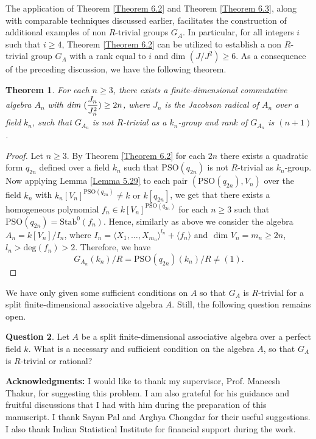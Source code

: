 \documentclass[12pt]{amsart}
\newtheorem{theorem}{Theorem}[section]
\theoremstyle{definition}
\newtheorem{question}[theorem]{Question}
\numberwithin{equation}{section}
\begin{document}
The application of Theorem \ref{Theorem 6.2} and Theorem \ref{Theorem 6.3}, along with comparable techniques discussed earlier, facilitates the construction of additional examples of non $R$-trivial groups \( G_A \). In particular, for all integers \( i \) such that \( i\geq 4 \), Theorem \ref{Theorem 6.2} can be utilized to establish a non $R$-trivial group \( G_A \) with a rank equal to \( i \) and $\text{dim }(J/J^2)\geq 6$. As a consequence of the preceding discussion, we have the following theorem.
\begin{theorem}\label{Theorem 6.4}
For each $n\geq3$, there exists a finite-dimensional commutative algebra $A_n$ with $\emph{dim } \displaystyle (\frac{J_n}{J_n^2})\geq 2n$, where $J_n$ is the Jacobson radical of $A_n$ over a field $k_n$, such that $G_{A_n}$ is not $R$-trivial as a $k_n$-group and rank of $G_{A_n}$ is $(n+1)$. 
\end{theorem}
\vskip1mm
\begin{proof}
Let $n\geq 3$. By Theorem \ref{Theorem 6.2} for each $2n$ there exists a quadratic form $q_{2n}$ defined over a field $k_n$ such that $\mathrm{PSO}(q_{2n})$ is not $R$-trivial as $k_n$-group. Now applying Lemma \ref{Lemma 5.29} to each pair $(\mathrm{PSO}(q_{2n}),V_n)$ over the field $k_n$ with $k_n[V_n]^{\mathrm{PSO}(q_{2n})}\neq k \text{ or }k[q_{2n}]$, we get that there exists a homogeneous polynomial $f_n\in k[V_n]^{\mathrm{PSO}(q_{2n})}$ for each $n\geq 3$ such that $\mathrm{PSO}(q_{2n})=\mathrm{Stab}^{0}(f_n)$. Hence, similarly as above we consider the algebra $A_n=k[V_n]/I_n$, where $I_n=\langle X_1,\dots,X_{m_{n}}\rangle ^{l_n}+\langle f_n\rangle$ and $\text{ dim }V_n=m_n\geq 2n$, $l_n> \text{deg}(f_n)>2$. Therefore, we have \[G_{A_n}(k_n)/R= \mathrm{PSO}(q_{2n})(k_n)/R\neq (1).\]
\end{proof}
\vspace{2mm}
\noindent
We have only given some sufficient conditions on $A$ so that $G_A$ is $R$-trivial for a split finite-dimensional associative algebra $A$. Still, the following question remains open.
\begin{question}
Let $A$ be a split finite-dimensional associative algebra over a perfect field $k$. What is a necessary and sufficient condition on the algebra $A$, so that $G_A$ is $R$-trivial or rational? 
\end{question}
 \noindent
 {\bf Acknowledgments:} I would like to thank my supervisor, Prof. Maneesh Thakur, for suggesting this problem. I am also grateful for his guidance and fruitful discussions that I had with him during the preparation of this manuscript. I thank Sayan Pal and Arghya Chongdar for their useful suggestions. I also thank Indian Statistical Institute for financial support during the work.





\end{document}
